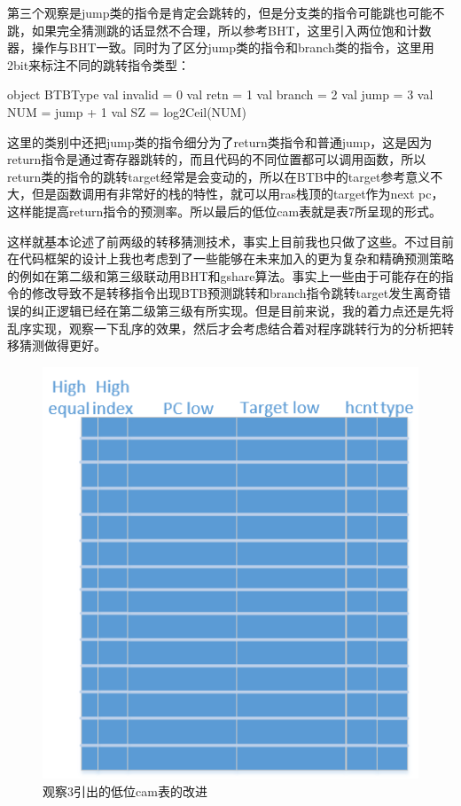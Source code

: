 \documentclass[11pt]{article}
\begin{document}
第三个观察是jump类的指令是肯定会跳转的，但是分支类的指令可能跳也可能不跳，如果完全猜测跳的话显然不合理，所以参考BHT，这里引入两位饱和计数器，操作与BHT一致。同时为了区分jump类的指令和branch类的指令，这里用2bit来标注不同的跳转指令类型：
\begin{scala}
	object BTBType {
		val invalid = 0
		val retn    = 1
		val branch  = 2
		val jump    = 3
		val NUM = jump + 1
		val SZ = log2Ceil(NUM)
	}
\end{scala}
这里的类别中还把jump类的指令细分为了return类指令和普通jump，这是因为return指令是通过寄存器跳转的，而且代码的不同位置都可以调用函数，所以return类的指令的跳转target经常是会变动的，所以在BTB中的target参考意义不大，但是函数调用有非常好的栈的特性，就可以用ras栈顶的target作为next pc，这样能提高return指令的预测率。所以最后的低位cam表就是表7所呈现的形式。

这样就基本论述了前两级的转移猜测技术，事实上目前我也只做了这些。不过目前在代码框架的设计上我也考虑到了一些能够在未来加入的更为复杂和精确预测策略的例如在第二级和第三级联动用BHT和gshare算法。事实上一些由于可能存在的指令的修改导致不是转移指令出现BTB预测跳转和branch指令跳转target发生离奇错误的纠正逻辑已经在第二级第三级有所实现。但是目前来说，我的着力点还是先将乱序实现，观察一下乱序的效果，然后才会考虑结合着对程序跳转行为的分析把转移猜测做得更好。
\begin{figure}[H]
	\centering
	\includegraphics[width=0.5\linewidth]{figs/btb3.png}
	\caption{观察3引出的低位cam表的改进}
\end{figure}
\end{document}
